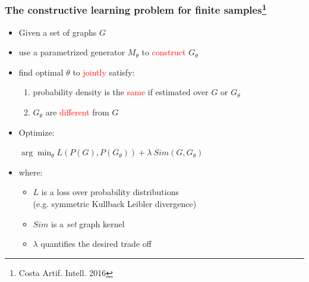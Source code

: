 \documentclass{beamer}
\newcommand{\red}[1]{\textcolor{red}{#1}}
\begin{document}
\begin{frame}
\frametitle{The constructive learning problem for finite samples\footnote{Costa Artif. Intell. 2016}}
    \begin{itemize}
        \item Given a set of graphs $G$
        \item use a parametrized generator $M_\theta$ to \red{construct} $G_\theta$
        \item find optimal $\theta$ to \red{jointly} satisfy:
            \begin{enumerate}
        \item probability density is the \red{same} if estimated over $G$ or $G_\theta$
        \item $G_\theta$ are \red{different} from $G$
            \end{enumerate}
        \item Optimize:\\ \begin{center} $\arg \min_\theta L(P(G),P(G_\theta)) + \lambda  ~ Sim(G, G_\theta)$ \end{center}
        \item where:
        \begin{itemize}
            \item $L$ is a loss over probability distributions \\(e.g. symmetric Kullback Leibler divergence)
            \item $Sim$ is a {\em set} graph kernel
            \item $\lambda$ quantifies the desired trade off
        \end{itemize}
    
    \end{itemize}
\end{frame}
\end{document}

